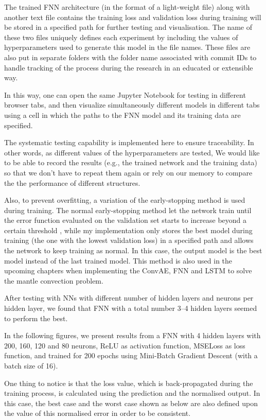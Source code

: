The trained FNN architecture (in the format of a light-weight file) along with another text file contains the training loss and validation loss during training will be stored in a specified path for further testing and visualisation. The name of these two files uniquely defines each experiment by including the values of hyperparameters used to generate this model in the file names. These files are also put in separate folders with the folder name associated with commit IDs to handle tracking of the process during the research in an educated or extensible way.

In this way, one can open the same Jupyter Notebook for testing in different browser tabs, and then visualize simultaneously different models in different tabs using a cell in which the paths to the FNN model and its training data are specified. 

The systematic testing capability is implemented here to ensure traceability. In other words, as different values of the hyperparameters are tested, We would like to be able to record the results (e.g., the trained network and the training data) so that we don't have to repeat them again or rely on our memory to compare the the performance of different structures.

Also, to prevent overfitting, a variation of the early-stopping method is used during training. The normal early-stopping method let the network train until the error function evaluated on the validation set starts to increase beyond a certain threshold \citep{10.1007_978-3-642-35289-8_5}, while my implementation only stores the best model during training (the one with the lowest validation loss) in a specified path and allows the network to keep training as normal. In this case, the output model is the best model instead of the last trained model. This method is also used in the upcoming chapters when implementing the ConvAE, FNN and LSTM to solve the mantle convection problem.

After testing with NNs with different number of hidden layers and neurons per hidden layer, we found that FNN with a total number 3–4 hidden layers seemed to perform the best.

In the following figures, we present results from a FNN with 4 hidden layers with 200, 160, 120 and 80 neurons, ReLU as activation function, MSELoss as loss function, and trained for 200 epochs using Mini-Batch Gradient Descent (with a batch size of 16).

One thing to notice is that the loss value, which is back-propagated during the training process, is calculated using the prediction and the normalised output. In this case, the best case and the worst case shown as below are also defined upon the value of this normalised error in order to be consistent.

